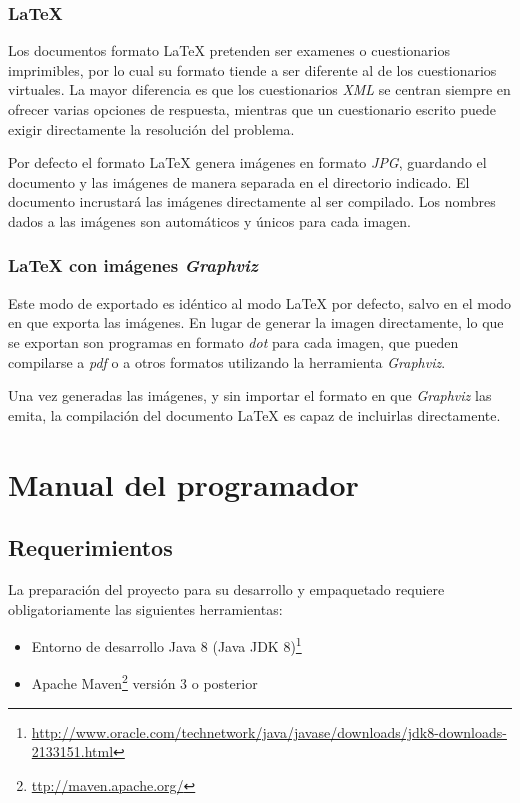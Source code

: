 
\subsubsection{\LaTeX{}}
Los documentos formato \LaTeX{} pretenden ser examenes o cuestionarios imprimibles, por lo cual su formato tiende a ser diferente al de los cuestionarios virtuales.
La mayor diferencia es que los cuestionarios \emph{XML} se centran siempre en ofrecer varias opciones de respuesta, mientras que un cuestionario escrito puede exigir directamente la resolución del problema.

Por defecto el formato \LaTeX{} genera imágenes en formato \emph{JPG}, guardando el documento y las imágenes de manera separada en el directorio indicado.
El documento incrustará las imágenes directamente al ser compilado.
Los nombres dados a las imágenes son automáticos y únicos para cada imagen.

\subsubsection{\LaTeX{} con imágenes \emph{Graphviz}}
Este modo de exportado es idéntico al modo \LaTeX{} por defecto, salvo en el modo en que exporta las imágenes.
En lugar de generar la imagen directamente, lo que se exportan son programas en formato \emph{dot} para cada imagen, que pueden compilarse a \emph{pdf} o a otros formatos utilizando la herramienta \emph{Graphviz}.

Una vez generadas las imágenes, y sin importar el formato en que \emph{Graphviz} las emita, la compilación del documento \LaTeX{} es capaz de incluirlas directamente.

\section{Manual del programador}

\subsection{Requerimientos}
La preparación del proyecto para su desarrollo y empaquetado requiere obligatoriamente las siguientes herramientas:
\begin{itemize}
	\item Entorno de desarrollo Java 8 (Java JDK 8)\footnote{\url{http://www.oracle.com/technetwork/java/javase/downloads/jdk8-downloads-2133151.html}}
	\item Apache Maven\footnote{\url{ttp://maven.apache.org/}} versión 3 o posterior
\end{itemize}

